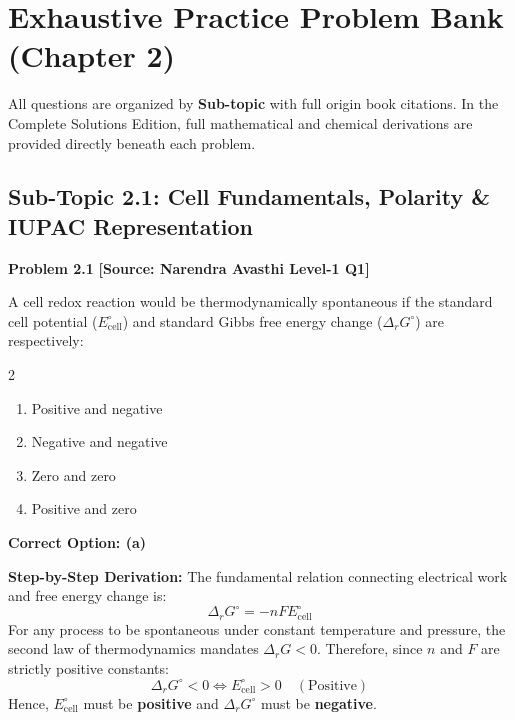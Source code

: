 \newpage
\section{Exhaustive Practice Problem Bank (Chapter 2)}
\label{sec:ch02_problem_bank}

\begin{tcolorbox}[enhanced,colback=subtlegreen,colframe=cengagegreen,arc=2mm,boxrule=1pt,title=\textbf{\large Organization of Practice Problems}]
All questions are organized by \textbf{Sub-topic} with full origin book citations. In the Complete Solutions Edition, full mathematical and chemical derivations are provided directly beneath each problem.
\end{tcolorbox}

\subsection{Sub-Topic 2.1: Cell Fundamentals, Polarity \& IUPAC Representation}

\begin{problembox}
\textbf{Problem 2.1} \hfill \textbf{[Source: Narendra Avasthi Level-1 Q1]}

A cell redox reaction would be thermodynamically spontaneous if the standard cell potential ($E^\circ_{\text{cell}}$) and standard Gibbs free energy change ($\Delta_r G^\circ$) are respectively:
\begin{multicols}{2}
\begin{enumerate}[label=(\alph*)]
    \item Positive and negative
    \item Negative and negative
    \item Zero and zero
    \item Positive and zero
\end{enumerate}
\end{multicols}
\end{problembox}
\begin{solution}
\textbf{Correct Option: (a)}

\textbf{Step-by-Step Derivation:}
The fundamental relation connecting electrical work and free energy change is:
\begin{equation*}
    \Delta_r G^\circ = -n F E^\circ_{\text{cell}}
\end{equation*}
For any process to be spontaneous under constant temperature and pressure, the second law of thermodynamics mandates $\Delta_r G < 0$. Therefore, since $n$ and $F$ are strictly positive constants:
\begin{equation*}
    \Delta_r G^\circ < 0 \iff E^\circ_{\text{cell}} > 0 \quad (\text{Positive})
\end{equation*}
Hence, $E^\circ_{\text{cell}}$ must be \textbf{positive} and $\Delta_r G^\circ$ must be \textbf{negative}.
\end{solution}

